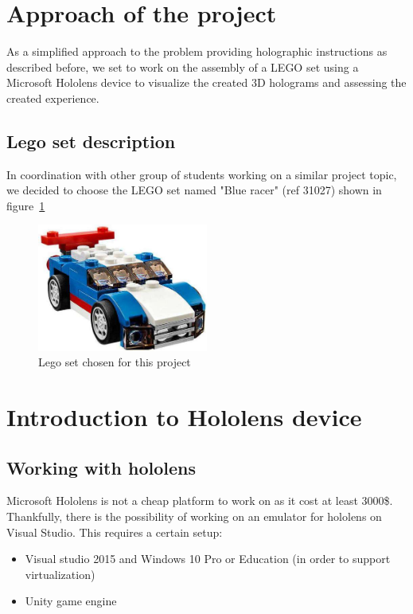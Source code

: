 \documentclass[a4paper,10pt]{article}
\begin{document}
\section{Approach of the project}
As a simplified approach to the problem providing holographic instructions as described before, we set to work on the assembly of a LEGO set using a Microsoft Hololens device to visualize the created 3D holograms and assessing the created experience. 

\subsection{Lego set description} %
In coordination with other group of students working on a similar project topic, we decided to choose the LEGO set named "Blue racer" (ref 31027) shown in figure~\ref{BlueRacer}
\begin{figure}
    \centering
    \includegraphics[width=0.5\textwidth]{BlueRacer}
    \caption{Lego set chosen for this project}
    \label{BlueRacer}
\end{figure}

\section{Introduction to Hololens device}

\subsection{Working with hololens}

Microsoft Hololens is not a cheap platform to work on as it cost at least 3000\$. Thankfully, there is the possibility of working on an emulator for hololens on Visual Studio. This requires a certain setup:
\begin{itemize}
	\item Visual studio 2015 and Windows 10 Pro or Education (in order to support virtualization)
	\item Unity game engine
\end{itemize}
\end{document}

